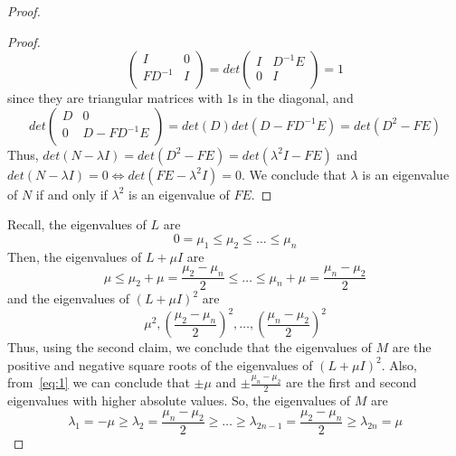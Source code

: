 \begin{problem}
\begin{sol}
\begin{proof}
\begin{claim}
\begin{proof}
\[\begin{pmatrix}
                            I       & 0 \\
                            FD^{-1} & I \\
                        \end{pmatrix} = det
                        \begin{pmatrix}
                            I & D^{-1}E \\
                            0 & I \\
                        \end{pmatrix} = 1
                    \]
                    since they are triangular matrices with $1$s in the diagonal, and \[det
                        \begin{pmatrix}
                            D & 0 \\
                            0 & D - FD^{-1}E \\
                        \end{pmatrix} = det(D) det(D - FD^{-1}E) = det(D^2 -F E)
                    \]
                    Thus, $det(N - \lambda I) = det(D^2 -F E) = det(\lambda^2 I - FE)$ and $det(N - \lambda I) = 0 \Leftrightarrow det(FE - \lambda^2 I) = 0$.
                    We conclude that $\lambda$ is an eigenvalue of $N$ if and only if $\lambda^2$ is an eigenvalue of $F E$.
                \end{proof}
            \end{claim}

            Recall, the eigenvalues of $L$ are
            \[
                0 = \mu_1 \leq \mu_2 \leq \dots \leq \mu_n
            \]
            Then, the eigenvalues of $L + \mu I$ are
            \[\label{eq:1}\tag{1}
                \mu \leq \mu_2 + \mu = \frac{\mu_2 - \mu_n}{2} \leq \dots \leq \mu_n + \mu = \frac{\mu_n - \mu_2}{2}
            \]
            and the eigenvalues of $(L + \mu I)^2$ are
            \[
                \mu^2, \left(\frac{\mu_2 - \mu_n}{2}\right)^2, \dots, \left(\frac{\mu_n - \mu_2}{2}\right)^2
            \]
            Thus, using the second claim, we conclude that the eigenvalues of $M$ are the positive and negative square roots of the eigenvalues
            of $(L + \mu I)^2$.
            Also, from~\ref{eq:1} we can conclude that $\pm\mu$ and $\pm\frac{\mu_n - \mu_2}{2}$ are the first and second eigenvalues with higher absolute values.
            So, the eigenvalues of $M$ are
            \[
                \lambda_1 = -\mu \geq \lambda_2 = \frac{\mu_n - \mu_2}{2} \geq \dots \geq \lambda_{2n-1} = \frac{\mu_2 - \mu_n}{2} \geq \lambda_{2n} = \mu
            \]


\end{proof}
\end{sol}
\end{problem}
